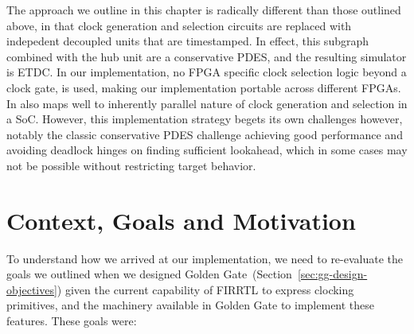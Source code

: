 The approach we outline in this chapter is radically different than those
outlined above, in that clock generation and selection circuits are replaced
with indepedent decoupled units that are timestamped. In effect, this subgraph
combined with the hub unit are a conservative PDES, and the resulting simulator
is ETDC.  In our implementation, no FPGA specific clock selection logic beyond
a clock gate, is used, making our implementation portable across different
FPGAs. In also maps well to inherently parallel nature of clock generation and
selection in a SoC. However, this implementation strategy begets its own
challenges however, notably the classic conservative PDES challenge achieving
good performance and avoiding deadlock hinges on finding sufficient lookahead,
which in some cases may not be possible without restricting target behavior.

\section{Context, Goals and Motivation}

To understand how we arrived at our implementation, we need to re-evaluate the
goals we outlined when we designed Golden Gate~(Section~\ref{sec:gg-design-objectives}) given the current capability
of FIRRTL to express clocking primitives, and the machinery available in Golden
Gate to implement these features. These goals were:

